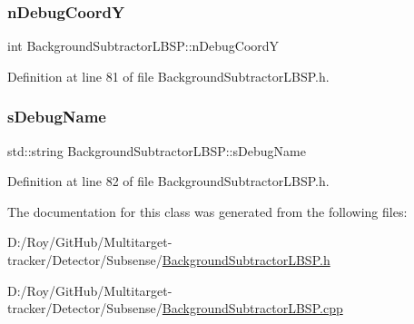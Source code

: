 \subsubsection{\texorpdfstring{n\+Debug\+CoordY}{nDebugCoordY}}
{\footnotesize\ttfamily int Background\+Subtractor\+L\+B\+S\+P\+::n\+Debug\+CoordY}



Definition at line 81 of file Background\+Subtractor\+L\+B\+S\+P.\+h.

\mbox{\label{class_background_subtractor_l_b_s_p_ada55b4a5eec8c82d0e05b0f9f1600ecb}} 
\subsubsection{\texorpdfstring{s\+Debug\+Name}{sDebugName}}
{\footnotesize\ttfamily std\+::string Background\+Subtractor\+L\+B\+S\+P\+::s\+Debug\+Name}



Definition at line 82 of file Background\+Subtractor\+L\+B\+S\+P.\+h.



The documentation for this class was generated from the following files\+:\begin{DoxyCompactItemize}
\item 
D\+:/\+Roy/\+Git\+Hub/\+Multitarget-\/tracker/\+Detector/\+Subsense/\mbox{\hyperlink{_background_subtractor_l_b_s_p_8h}{Background\+Subtractor\+L\+B\+S\+P.\+h}}\item 
D\+:/\+Roy/\+Git\+Hub/\+Multitarget-\/tracker/\+Detector/\+Subsense/\mbox{\hyperlink{_background_subtractor_l_b_s_p_8cpp}{Background\+Subtractor\+L\+B\+S\+P.\+cpp}}\end{DoxyCompactItemize}
